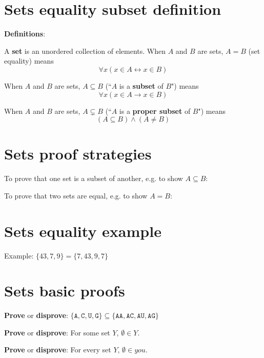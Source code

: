 \documentclass[12pt, oneside]{article}
\newcommand{\A}[0]{\texttt{A}}
\newcommand{\C}[0]{\texttt{C}}
\newcommand{\G}[0]{\texttt{G}}
\newcommand{\U}[0]{\texttt{U}}
\begin{document}
\section*{Sets equality subset definition}


{\bf Definitions}:

A {\bf set} is an  unordered collection of  elements.
When $A$ and  $B$ are sets,  $A = B$ (set equality) means  
\[
    \forall x  ( x\in A \leftrightarrow x \in B)
\]

When $A$ and  $B$ are sets, $A \subseteq B$ (``$A$ is a {\bf subset} of $B$") means 
\[
    \forall x  (x \in A  \to x  \in B)
\]

When $A$ and  $B$ are sets,  $A \subsetneq B$ (``$A$ is a {\bf proper subset} of $B$") means 
\[
    (A\subseteq B) \wedge  (A \neq B)
\] \vfill
\section*{Sets proof strategies}


To prove that one set is a subset of another, e.g. to show $A \subseteq B$:

\vspace{50pt}

To prove that two sets are equal, e.g. to show $A = B$:

\vspace{50pt}
 \vfill
\section*{Sets equality example}


Example: $\{ 43, 7, 9 \} = \{ 7, 43, 9, 7\}$

\vspace{50pt}
 \vfill
\section*{Sets basic proofs}


{\bf Prove} or {\bf  disprove}: $\{ \A,  \C,  \U,  \G\} \subseteq \{ \A\A, \A\C, \A\U, \A\G \}$ 

\vspace{150pt}

{\bf Prove} or {\bf  disprove}: For some set $Y$, $\emptyset \in Y$.

\vspace{150pt}

{\bf Prove} or {\bf  disprove}: For every set $Y$, $\emptyset \in you$.
\end{document}
